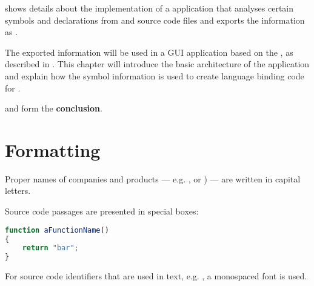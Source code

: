  shows details about the implementation of a  application that analyses certain symbols and declarations from  and  source code files and exports the information as .

The exported information will be used in a GUI application based on the , as described in . This chapter will introduce the basic architecture of the application and explain how the symbol information is used to create language binding code for .

 and  form the \textbf{conclusion}.

\section{Formatting}

Proper names of companies and products --- e.g. ,  or \linebreak{}) --- are written in capital letters.

Source code passages are presented in special boxes:

\SingleSpacing
\begin{lstlisting}[language=JavaScript, caption=Example source code]
function aFunctionName()
{
	return "bar";
}
\end{lstlisting}
\OnehalfSpacing

For source code identifiers that are used in text, e.g. , a monospaced font is used.





